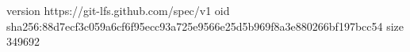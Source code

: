 version https://git-lfs.github.com/spec/v1
oid sha256:88d7ecf3c059a6cf6f95ecc93a725e9566e25d5b969f8a3e880266bf197bcc54
size 349692
